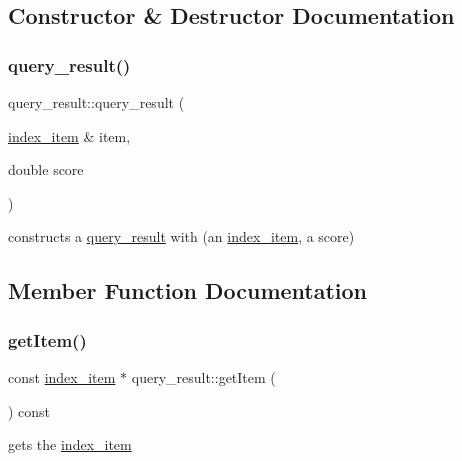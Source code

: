 \subsection{Constructor \& Destructor Documentation}
\mbox{\label{classquery__result_a3bfdb6247df84d9076c70a1d41ab2a51}} 
\subsubsection{\texorpdfstring{query\+\_\+result()}{query\_result()}}
{\footnotesize\ttfamily query\+\_\+result\+::query\+\_\+result (\begin{DoxyParamCaption}\item[{\hyperlink{classindex__item}{index\+\_\+item} \&}]{item,  }\item[{double}]{score }\end{DoxyParamCaption})}

constructs a \hyperlink{classquery__result}{query\+\_\+result} with (an \hyperlink{classindex__item}{index\+\_\+item}, a score) 

\subsection{Member Function Documentation}
\mbox{\label{classquery__result_aba6c70d1ea798b10857bcd86df23dfb9}} 
\subsubsection{\texorpdfstring{get\+Item()}{getItem()}}
{\footnotesize\ttfamily const \hyperlink{classindex__item}{index\+\_\+item} $\ast$ query\+\_\+result\+::get\+Item (\begin{DoxyParamCaption}{ }\end{DoxyParamCaption}) const}

gets the \hyperlink{classindex__item}{index\+\_\+item} \mbox{\label{classquery__result_a85702eafe30f0f8bf4c7acb17b761e04}} 
